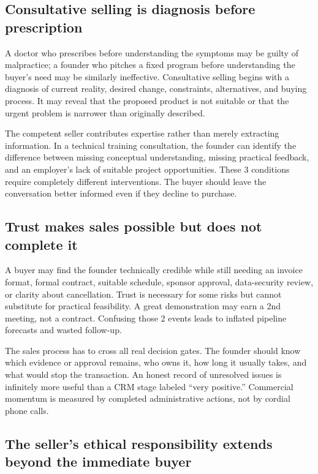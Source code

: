 \subsection{Consultative selling is diagnosis before prescription}

A doctor who prescribes before understanding the symptoms may be guilty of malpractice; a founder who pitches a fixed program before understanding the buyer's need may be similarly ineffective. Consultative selling begins with a diagnosis of current reality, desired change, constraints, alternatives, and buying process. It may reveal that the proposed product is not suitable or that the urgent problem is narrower than originally described.

The competent seller contributes expertise rather than merely extracting information. In a technical training consultation, the founder can identify the difference between missing conceptual understanding, missing practical feedback, and an employer's lack of suitable project opportunities. These 3 conditions require completely different interventions. The buyer should leave the conversation better informed even if they decline to purchase.

\subsection{Trust makes sales possible but does not complete it}

A buyer may find the founder technically credible while still needing an invoice format, formal contract, suitable schedule, sponsor approval, data-security review, or clarity about cancellation. Trust is necessary for some risks but cannot substitute for practical feasibility. A great demonstration may earn a 2nd meeting, not a contract. Confusing those 2 events leads to inflated pipeline forecasts and wasted follow-up.

The sales process has to cross all real decision gates. The founder should know which evidence or approval remains, who owns it, how long it usually takes, and what would stop the transaction. An honest record of unresolved issues is infinitely more useful than a CRM stage labeled ``very positive.'' Commercial momentum is measured by completed administrative actions, not by cordial phone calls.

\subsection{The seller's ethical responsibility extends beyond the immediate buyer}

